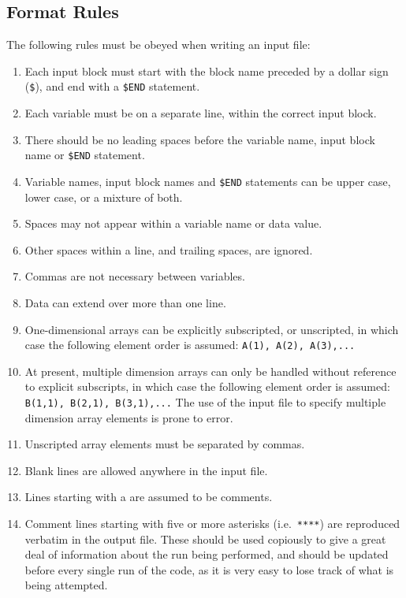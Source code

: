 \documentclass[11pt,a4paper]{report}
\begin{document}
\subsection{Format Rules}

The following rules must be obeyed when writing an input file:

\begin{enumerate}
\item
Each input block must start with the block name preceded by a dollar sign
({\tt \$}), and end with a {\tt \$END} statement.
\item
Each variable must be on a separate line, within the correct input block.
\item
There should be no leading spaces before the variable name, input block name
or {\tt \$END} statement.%
\item
Variable names, input block names and {\tt \$END} statements can be upper %
case, lower case, or a mixture of both.
\item
Spaces may not appear within a variable name or data value.
\item
Other spaces within a line, and trailing spaces, are ignored.
\item
Commas are not necessary between variables.
\item
Data can extend over more than one line.
\item
One-dimensional arrays can be explicitly subscripted, or unscripted, in which
case the following element order is assumed: {\tt A(1), A(2), A(3),...}
\item
At present, multiple dimension arrays can only be handled without reference to
explicit subscripts, in which case the following element order is assumed:
{\tt B(1,1), B(2,1), B(3,1),...} The use of the input file to specify multiple
dimension array elements is prone to error.
\item
Unscripted array elements must be separated by commas.
\item
Blank lines are allowed anywhere in the input file.
\item
Lines starting with a {\tt *} are assumed to be comments.
\item
Comment lines starting with five or more asterisks (i.e.\ {\tt *****}) are
reproduced verbatim in the output file. These should be used copiously to give
a great deal of information about the run being performed, and should be
updated before every single run of the code, as it is very easy to lose track
of what is being attempted.
\end{enumerate}
\end{document}
